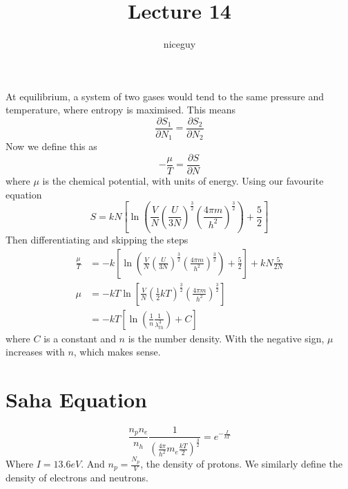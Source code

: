 \documentclass[12pt]{article}
\author{niceguy}
\title{Lecture 14}
\begin{document}
\maketitle

At equilibrium, a system of two gases would tend to the same pressure and temperature, where entropy is maximised. This means
$$\frac{\partial S_1}{\partial N_1} = \frac{\partial S_2}{\partial N_2}$$
Now we define this as
$$-\frac{\mu}{T} = \frac{\partial S}{\partial N}$$
where $\mu$ is the chemical potential, with units of energy. Using our favourite equation
$$S = kN\left[\ln\left(\frac{V}{N}\left(\frac{U}{3N}\right)^{\frac{3}{2}}\left(\frac{4\pi m}{h^2}\right)^{\frac{3}{2}}\right) + \frac{5}{2}\right]$$
Then differentiating and skipping the steps
\begin{align*}
    \frac{\mu}{T} &= -k\left[\ln\left(\frac{V}{N}\left(\frac{U}{3N}\right)^{\frac{3}{2}}\left(\frac{4\pi m}{h^2}\right)^{\frac{3}{2}}\right) + \frac{5}{2}\right] + kN\frac{5}{2N} \\
    \mu &= -kT\ln\left[\frac{V}{N}\left(\frac{1}{2}kT\right)^{\frac{3}{2}}\left(\frac{4\pi m}{h^2}\right)^{\frac{3}{2}}\right] \\
        &= -kT\left[\ln\left(\frac{1}{n} \frac{1}{\lambda_{th}^3}\right) + C\right]
\end{align*}
where $C$ is a constant and $n$ is the number density. With the negative sign, $\mu$ increases with $n$, which makes sense.

\section{Saha Equation}

$$\frac{n_pn_e}{n_h} \frac{1}{\left(\frac{4\pi}{h^2}m_e\frac{kT}{2}\right)^{\frac{3}{2}}} = e^{-\frac{I}{kT}}$$
Where $I=13.6\unit{eV}$. And $n_p = \frac{N_p}{V}$, the density of protons. We similarly define the density of electrons and neutrons.
\end{document}
